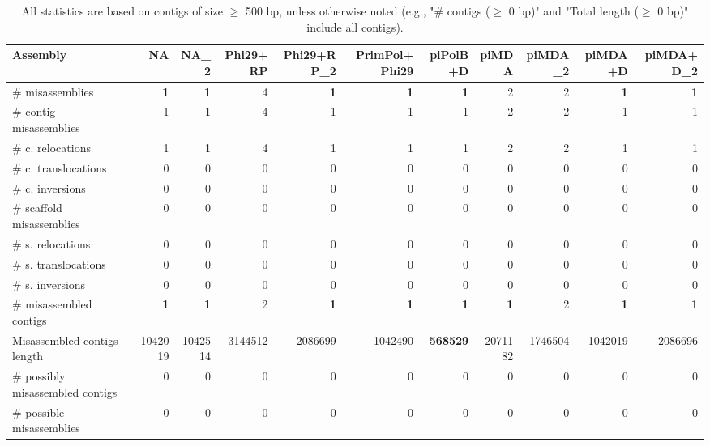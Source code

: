 \documentclass[12pt,a4paper]{article}
\begin{document}
\begin{table}[ht]
\begin{center}
\caption{All statistics are based on contigs of size $\geq$ 500 bp, unless otherwise noted (e.g., "\# contigs ($\geq$ 0 bp)" and "Total length ($\geq$ 0 bp)" include all contigs).}
\begin{tabular}{|l*{10}{|r}|}
\hline
Assembly & NA & NA\_2 & Phi29+RP & Phi29+RP\_2 & PrimPol+Phi29 & piPolB+D & piMDA & piMDA\_2 & piMDA+D & piMDA+D\_2 \\ \hline
\# misassemblies & {\bf 1} & {\bf 1} & 4 & {\bf 1} & {\bf 1} & {\bf 1} & 2 & 2 & {\bf 1} & {\bf 1} \\ \hline
\hspace{2mm}\# contig misassemblies & 1 & 1 & 4 & 1 & 1 & 1 & 2 & 2 & 1 & 1 \\ \hline
\hspace{5mm}\# c. relocations & 1 & 1 & 4 & 1 & 1 & 1 & 2 & 2 & 1 & 1 \\ \hline
\hspace{5mm}\# c. translocations & 0 & 0 & 0 & 0 & 0 & 0 & 0 & 0 & 0 & 0 \\ \hline
\hspace{5mm}\# c. inversions & 0 & 0 & 0 & 0 & 0 & 0 & 0 & 0 & 0 & 0 \\ \hline
\hspace{2mm}\# scaffold misassemblies & 0 & 0 & 0 & 0 & 0 & 0 & 0 & 0 & 0 & 0 \\ \hline
\hspace{5mm}\# s. relocations & 0 & 0 & 0 & 0 & 0 & 0 & 0 & 0 & 0 & 0 \\ \hline
\hspace{5mm}\# s. translocations & 0 & 0 & 0 & 0 & 0 & 0 & 0 & 0 & 0 & 0 \\ \hline
\hspace{5mm}\# s. inversions & 0 & 0 & 0 & 0 & 0 & 0 & 0 & 0 & 0 & 0 \\ \hline
\# misassembled contigs & {\bf 1} & {\bf 1} & 2 & {\bf 1} & {\bf 1} & {\bf 1} & {\bf 1} & 2 & {\bf 1} & {\bf 1} \\ \hline
Misassembled contigs length & 1042019 & 1042514 & 3144512 & 2086699 & 1042490 & {\bf 568529} & 2071182 & 1746504 & 1042019 & 2086696 \\ \hline
\# possibly misassembled contigs & 0 & 0 & 0 & 0 & 0 & 0 & 0 & 0 & 0 & 0 \\ \hline
\hspace{5mm}\# possible misassemblies & 0 & 0 & 0 & 0 & 0 & 0 & 0 & 0 & 0 & 0 \\ \hline

\end{tabular}
\end{center}
\end{table}
\end{document}
